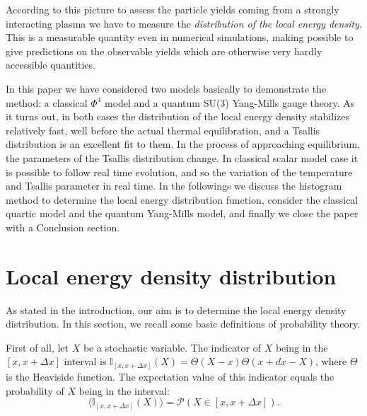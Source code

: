 \documentclass[aps,prd,twocolumn,showpacs,superscriptaddress,groupedaddress]{revtex4}  %
\begin{document}
According to this picture to assess the particle yields coming from a
strongly interacting plasma we have to measure the \emph{distribution
  of the local energy density}. This is a measurable quantity even in
numerical simulations, making possible to give predictions on the
observable yields which are otherwise very hardly accessible quantities.

In this paper we have considered two models basically to demonstrate the
method: a classical $\Phi^4$ model and a quantum SU(3) Yang-Mills
gauge theory. As it turns out, in both cases the distribution of the
local energy density stabilizes relatively fast, well before the
actual thermal equilibration, and a Tsallis distribution is an
excellent fit to them. In the process of approaching equilibrium, the
parameters of the Tsallis distribution change. In classical scalar
model case it is possible to follow real time evolution, and so the
variation of the temperature and Tsallis parameter in real time. In
the followings we discuss the histogram method to determine the local
energy distribution function, consider the classical quartic model and
the quantum Yang-Mills model, and finally we close the paper with a
Conclusion section.

\section{Local energy density distribution}
As stated in the introduction, our aim is to determine the local
energy density distribution. In this section, we recall some basic
definitions of probability theory.

First of all, let $X$ be a stochastic variable. The indicator of $X$
being in the \mbox{$[x,x+\Delta x]$} interval is
$\mathbb{I}_{[x,x+\Delta x]}(X) = \Theta(X-x)\Theta(x+dx-X)$, where
$\Theta$ is the Heaviside function. The expectation value of this
indicator equals the probability of $X$ being in the interval:
\begin{equation}
  \langle \mathbb{I}_{[x,x+\Delta x]}(X)\rangle = \mathcal{P}(X\in[x,x+\Delta x]).
  \label{eq:indicator}
\end{equation}
\end{document}
